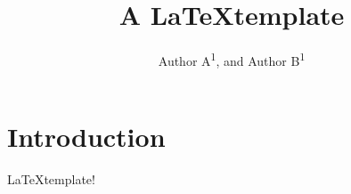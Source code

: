 \documentclass[]{article}
\begin{document}
\begin{acronym}
\end{acronym}

\vspace{1 cm}

\title{A \LaTeX template}

\author{Author A\textsuperscript{\textup{1}}, and Author B\textsuperscript{\textup{1}}}

\maketitle

\begin{abstract}

\end{abstract}
\acresetall


\section{Introduction}
\LaTeX template!

\end{document}
